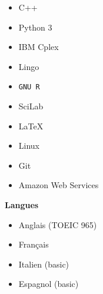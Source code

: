 \documentclass[11.5pt]{article}
\newcommand\en[1]{}
\newcommand\fr[1]{#1}
\begin{document}
\begin{minipage}[t]{\textwidth}
\begin{minipage}[t]{\cvRightWidth}
\begin{multicols}{2}
\begin{itemize}
                    \item C++
                    \item Python 3
                    \item IBM Cplex
                    \item Lingo
                    \item\texttt{GNU R}
                    \item SciLab
                    \item\LaTeX
                    \item Linux
                    \item Git
                    \item Amazon Web Services
                \end{itemize}
            \end{multicols}
            \textbf{Langues}
            \begin{multicols}{2}
                \begin{itemize}
                    \item \fr{Anglais}\en{English} {\footnotesize(TOEIC 965)}
                    \item \fr{Français}\en{French}
                    \item \fr{Italien}\en{Italian} {\footnotesize(basic)}
                    \item \fr{Espagnol}\en{Spanish} {\footnotesize(basic)}
                \end{itemize}
            \end{multicols}
        \end{minipage}
    \end{minipage}
\end{document}
